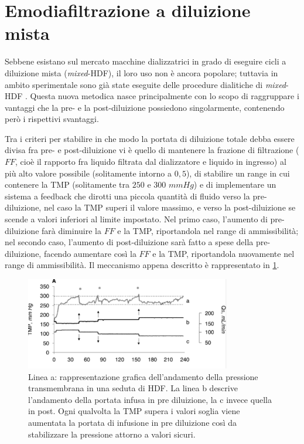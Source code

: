 \section{Emodiafiltrazione a diluizione mista}
Sebbene esistano sul mercato macchine dializzatrici in grado di eseguire cicli a diluizione mista (\textit{mixed}-HDF), il loro uso non è ancora popolare; tuttavia in ambito sperimentale sono già state eseguite delle procedure dialitiche di \textit{mixed}-HDF \cite{pedrini, pedrini2, pedrini3}.
Questa nuova metodica nasce principalmente con lo scopo di raggruppare i vantaggi che la pre- e la post-diluizione possiedono singolarmente, contenendo però i rispettivi svantaggi.

Tra i criteri per stabilire in che modo la portata di diluizione totale debba essere divisa fra pre- e post-diluizione vi è quello di mantenere la frazione di filtrazione ($FF$, cioè il rapporto fra liquido filtrata dal dializzatore e liquido in ingresso) al più alto valore possibile (solitamente intorno a $0,5$), di stabilire un range in cui contenere la TMP (solitamente tra $250$ e $300$ $mmHg$) e di implementare un sistema a feedback che dirotti una piccola quantità di fluido verso la pre-diluizione, nel caso la TMP superi il valore massimo, e verso la post-diluizione se scende a valori inferiori al limite impostato. Nel primo caso, l'aumento di pre-diluizione farà diminuire la $FF$ e la TMP, riportandola nel range di ammissibilità; nel secondo caso, l'aumento di post-diluizione sarà fatto a spese della pre-diluizione, facendo aumentare così la $FF$ e la TMP, riportandola nuovamente nel range di ammissibilità. Il meccanismo appena descritto è rappresentato in \figurename\ref{tmp}.
\begin{figure}[htb]
	\centering
		\includegraphics[width=0.8\textwidth]{immagini/NIC/tmp.eps}
		\caption{Linea a: rappresentazione grafica dell'andamento della pressione transmembrana in una seduta di HDF. La linea b descrive l'andamento della portata infusa in pre diluizione, la c invece quella in post. Ogni qualvolta la TMP supera i valori soglia viene aumentata la portata di infusione in pre diluizione così da stabilizzare la pressione attorno a valori sicuri.}\label{tmp}
\end{figure}
